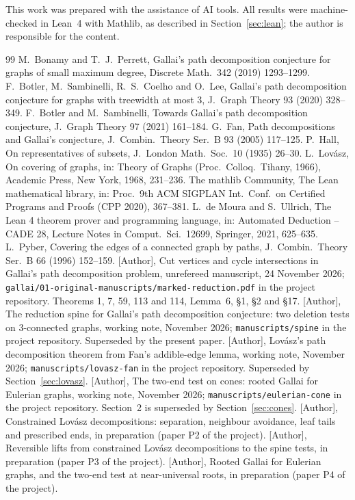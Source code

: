 \documentclass[11pt]{amsart}
\theoremstyle{definition}
\theoremstyle{remark}
\renewcommand{\_}{\oldunderscore\allowbreak}
\begin{document}
This work was prepared with the assistance of AI tools. All results were machine-checked in Lean~4
with Mathlib, as described in Section~\ref{sec:lean}; the author is responsible for the content.

\begin{thebibliography}{99}
 M.~Bonamy and T.~J.~Perrett, Gallai's path decomposition conjecture for graphs of small
maximum degree, Discrete Math.\ 342 (2019) 1293--1299.
 F.~Botler, M.~Sambinelli, R.~S.~Coelho and O.~Lee, Gallai's path decomposition
conjecture for graphs with treewidth at most 3, J.\ Graph Theory 93 (2020) 328--349.
 F.~Botler and M.~Sambinelli, Towards Gallai's path decomposition conjecture, J.\ Graph
Theory 97 (2021) 161--184.
 G.~Fan, Path decompositions and Gallai's conjecture, J.\ Combin.\ Theory Ser.~B 93
(2005) 117--125.
 P.~Hall, On representatives of subsets, J.\ London Math.\ Soc.\ 10 (1935) 26--30.
 L.~Lov\'asz, On covering of graphs, in: Theory of Graphs (Proc.\ Colloq.\ Tihany,
1966), Academic Press, New York, 1968, 231--236.
 The mathlib Community, The Lean mathematical library, in: Proc.\ 9th ACM SIGPLAN
Int.\ Conf.\ on Certified Programs and Proofs (CPP 2020), 367--381.
 L.~de Moura and S.~Ullrich, The Lean 4 theorem prover and programming language, in:
Automated Deduction -- CADE 28, Lecture Notes in Comput.\ Sci.\ 12699, Springer, 2021, 625--635.
 L.~Pyber, Covering the edges of a connected graph by paths, J.\ Combin.\ Theory
Ser.~B 66 (1996) 152--159.
 [Author], Cut vertices and cycle intersections in Gallai's path decomposition problem,
unrefereed manuscript, 24 November 2026; \texttt{gallai/01-original-manuscripts/marked-reduction.pdf}
in the project repository. Theorems 1, 7, 59, 113 and 114, Lemma~6, \S1, \S2 and \S17.
 [Author], The reduction spine for Gallai's path decomposition conjecture: two deletion
tests on $3$-connected graphs, working note, November 2026; \texttt{manuscripts/spine} in the project
repository. Superseded by the present paper.
 [Author], Lov\'asz's path decomposition theorem from Fan's addible-edge lemma, working
note, November 2026; \texttt{manuscripts/lovasz-fan} in the project repository. Superseded by
Section~\ref{sec:lovasz}.
 [Author], The two-end test on cones: rooted Gallai for Eulerian graphs, working note,
November 2026; \texttt{manuscripts/eulerian-cone} in the project repository. Section~2 is superseded
by Section~\ref{sec:cones}.
 [Author], Constrained Lov\'asz decompositions: separation, neighbour avoidance, leaf
tails and prescribed ends, in preparation (paper P2 of the project).
 [Author], Reversible lifts from constrained Lov\'asz decompositions to the spine tests,
in preparation (paper P3 of the project).
 [Author], Rooted Gallai for Eulerian graphs, and the two-end test at near-universal
roots, in preparation (paper P4 of the project).
\end{thebibliography}
\end{document}
